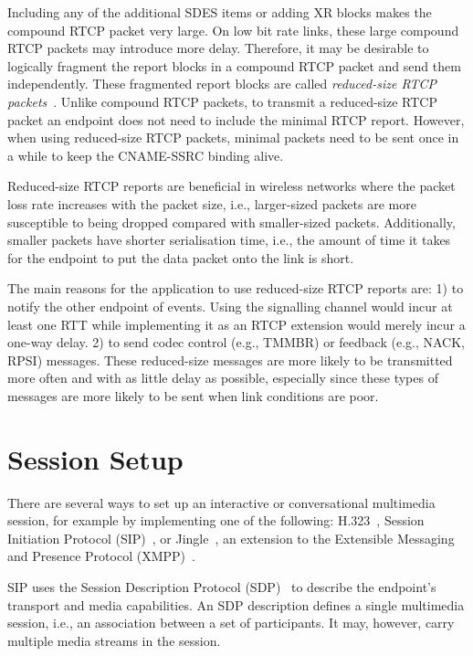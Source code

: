 Including any of the additional SDES items or adding XR blocks makes the
compound RTCP packet very large. On low bit rate links, these large compound
RTCP packets may introduce more delay. Therefore, it may be desirable to
logically fragment the report blocks in a compound RTCP packet and send them
independently. These fragmented report blocks are called \emph {reduced-size
RTCP packets}~\cite{rfc5506}. Unlike compound RTCP packets, to transmit a
reduced-size RTCP packet an endpoint does not need to include the minimal RTCP
report. However, when using reduced-size RTCP packets, minimal packets need to
be sent once in a while to keep the CNAME-SSRC binding alive.

Reduced-size RTCP reports are beneficial in wireless networks where the packet
loss rate increases with the packet size, i.e., larger-sized packets are more
susceptible to being dropped compared with smaller-sized packets. Additionally, smaller
packets have shorter serialisation time, i.e., the amount of time it takes for
the endpoint to put the data packet onto the link is short.

The main reasons for the application to use reduced-size RTCP reports are:
1) to notify the other endpoint of events. Using the signalling channel would
incur at least one RTT while implementing it as an RTCP extension would merely
incur a one-way delay. 2) to send codec control (e.g., TMMBR) or feedback (e.g.,
NACK, RPSI) messages. These reduced-size messages are more likely to be
transmitted more often and with as little delay as possible, especially since
these types of messages are more likely to be sent when link conditions are
poor.


\section{Session Setup}


There are several ways to set up an interactive or conversational multimedia
session, for example by implementing one of the following: H.323~\cite{H.323},
Session Initiation Protocol (SIP)~\cite{rfc3261}, or Jingle~\cite{XEP-0166}, an
extension to the Extensible Messaging and Presence Protocol
(XMPP)~\cite{rfc6120}.

SIP uses the Session Description Protocol (SDP)~\cite{rfc4566} to describe the
endpoint's transport and media capabilities. An SDP description defines a
single multimedia session, i.e., an association between a set of participants.
It may, however, carry multiple media streams in the session.

